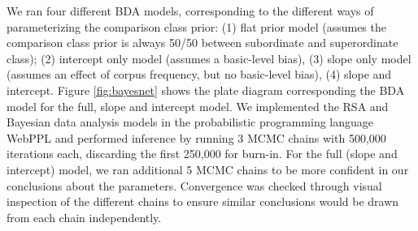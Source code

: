 \documentclass[doc]{apa6}
\begin{document}
We ran four different BDA models, corresponding to the different ways of parameterizing the comparison class prior: (1) flat prior model (assumes the comparison class prior is always 50/50 between subordinate and superordinate class); (2) intercept only model (assumes a basic-level bias), (3) slope only model (assumes an effect of corpus frequency, but no basic-level bias), (4) slope and intercept.
Figure \ref{fig:bayesnet} shows the plate diagram corresponding the BDA model for the full, slope and intercept model. 
We implemented the RSA and Bayesian data analysis models in the probabilistic programming language WebPPL \cite{dippl} and performed inference by running 3 MCMC chains with 500,000 iterations each, discarding the first 250,000 for burn-in. 
For the full (slope and intercept) model, we ran additional 5 MCMC chains to be more confident in our conclusions about the parameters. 
Convergence was checked through visual inspection of the different chains to ensure similar conclusions would be drawn from each chain independently. 





\end{document}
